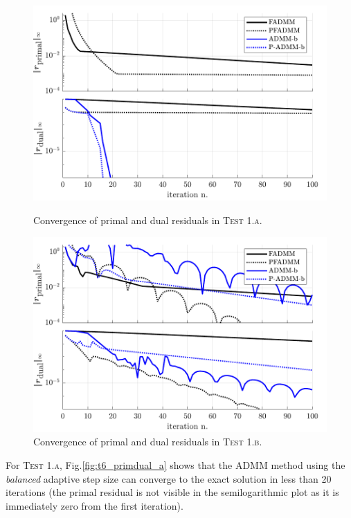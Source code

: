 \documentclass[final,3p]{elsarticle}
\begin{document}
\begin{figure}[!tbp]
  \centering
  \begin{minipage}[t]{0.48\textwidth}
    \includegraphics[width=\textwidth]{pics/t6_primdual_a.pdf}
    \caption{Convergence of primal and dual residuals in \textsc{Test 1.a}.}
		\label{fig:t6_primdual_a}
  \end{minipage}
  \hfill
  \begin{minipage}[t]{0.48\textwidth}
    \includegraphics[width=\textwidth]{pics/t6_primdual_b.pdf}
    \caption{Convergence of primal and dual residuals in \textsc{Test 1.b}. }
		\label{fig:t6_primdual_b}
  \end{minipage}
\end{figure}

For \textsc{Test 1.a}, Fig.\ref{fig:t6_primdual_a} shows that the ADMM method using the \textit{balanced} adaptive step size can converge to the exact solution in less than 20 iterations (the primal residual is not visible in the semilogarithmic plot as it is immediately zero from the first iteration). 
\end{document}
